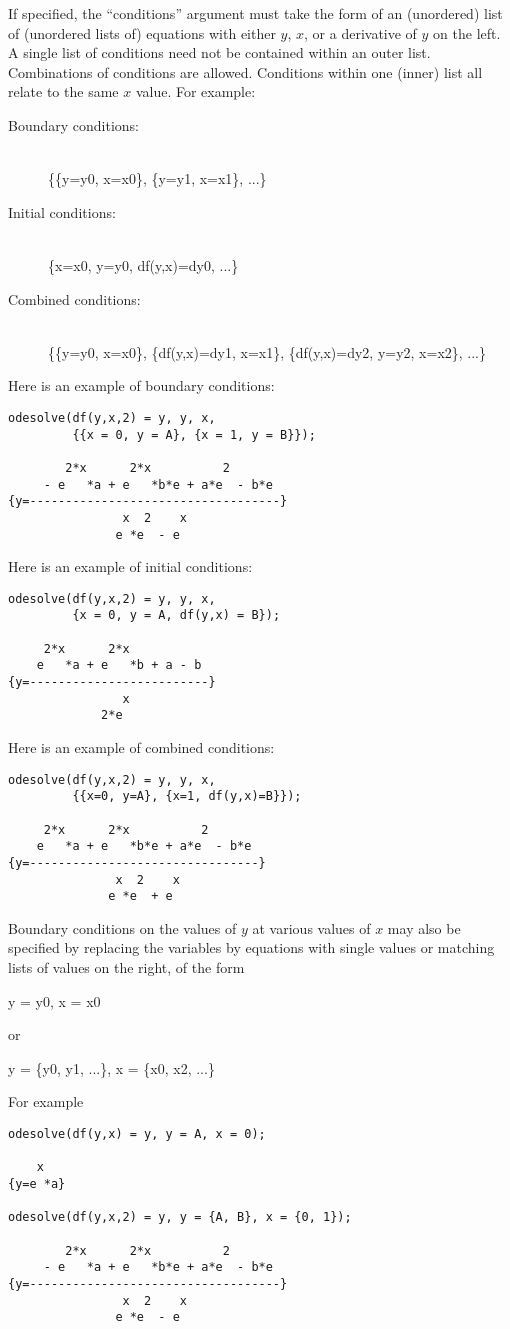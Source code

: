 If specified, the ``conditions'' argument must take the form of an
(unordered) list of (unordered lists of) equations with either $y$,
$x$, or a derivative of $y$ on the left.  A single list of conditions
need not be contained within an outer list.  Combinations of
conditions are allowed.  Conditions within one (inner) list all relate
to the same $x$ value.  For example:
\begin{description}
\item[Boundary conditions:] ~ \\
\{\{y=y0, x=x0\}, \{y=y1, x=x1\}, ...\}

\item[Initial conditions:] ~ \\
\{x=x0, y=y0, df(y,x)=dy0, ...\}

\item[Combined conditions:] ~ \\
\{\{y=y0, x=x0\}, \{df(y,x)=dy1, x=x1\}, \{df(y,x)=dy2, y=y2, x=x2\}, ...\}
\end{description}
Here is an example of boundary conditions:
\begin{verbatim}
odesolve(df(y,x,2) = y, y, x,
         {{x = 0, y = A}, {x = 1, y = B}});

        2*x      2*x          2
     - e   *a + e   *b*e + a*e  - b*e
{y=-----------------------------------}
                x  2    x
               e *e  - e
\end{verbatim}
Here is an example of initial conditions:
\begin{verbatim}
odesolve(df(y,x,2) = y, y, x,
         {x = 0, y = A, df(y,x) = B});

     2*x      2*x
    e   *a + e   *b + a - b
{y=-------------------------}
                x
             2*e
\end{verbatim}
Here is an example of combined conditions:
\begin{verbatim}
odesolve(df(y,x,2) = y, y, x,
         {{x=0, y=A}, {x=1, df(y,x)=B}});

     2*x      2*x          2
    e   *a + e   *b*e + a*e  - b*e
{y=--------------------------------}
               x  2    x
              e *e  + e
\end{verbatim}

Boundary conditions on the values of $y$ at various values of $x$ may
also be specified by replacing the variables by equations with single
values or matching lists of values on the right, of the form
\begin{center}
y = y0, x = x0
\end{center}
or
\begin{center}
y = \{y0, y1, ...\}, x = \{x0, x2, ...\}
\end{center}
For example
\begin{verbatim}
odesolve(df(y,x) = y, y = A, x = 0);

    x
{y=e *a}

odesolve(df(y,x,2) = y, y = {A, B}, x = {0, 1});

        2*x      2*x          2
     - e   *a + e   *b*e + a*e  - b*e
{y=-----------------------------------}
                x  2    x
               e *e  - e
\end{verbatim}


